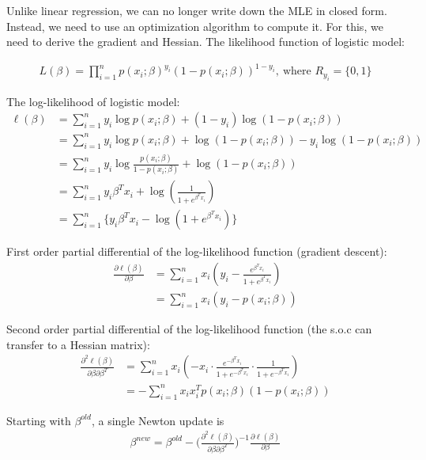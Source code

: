 \documentclass[12pt,a4paper]{article}%
\theoremstyle{definition}
\theoremstyle{plain}
\numberwithin{equation}{section}
\begin{document}
Unlike linear regression, we can no longer write down the MLE in closed form.
Instead, we need to use an optimization algorithm to compute it.
For this, we need to derive the gradient and Hessian. The likelihood function of logistic model:

\begin{gather}
L(\beta) = \prod_{i=1}^{n} p(x_{i};\beta)^{y_{i}} (1-p(x_{i};\beta))^{1-y_{i}},~\text{where~} R_{y_{i}}=\{0,1\}
\end{gather}

The log-likelihood of logistic model:
\begin{align*}
\ell(\beta)& = \sum\limits_{i=1}^{n} y_{i} \log p(x_{i};\beta)+(1-y_{i})\log (1-p(x_{i};\beta)) \\
		   & = \sum\limits_{i=1}^{n} y_{i} \log p(x_{i};\beta) + \log (1-p(x_{i};\beta)) - y_{i} \log (1-p(x_{i};\beta))\\
		   & = \sum\limits_{i=1}^{n} y_{i} \log \frac{p(x_{i};\beta)}{1-p(x_{i};\beta)} + \log (1-p(x_{i};\beta))  \\
		   & = \sum\limits_{i=1}^{n} y_{i}\beta^{T}x_{i}+ \log (\frac{1}{1+e^{\beta^{T}x_{i}}}) \\
 		   & = \sum\limits_{i=1}^{n} \{y_{i}\beta^{T}x_{i}-\log (1+e^{\beta^{T}x_{i}})\}
\end{align*}

First order partial differential of the log-likelihood function (gradient descent):
\begin{align*}
\frac{\partial \ell(\beta)}{\partial \beta} & = \sum\limits_{i=1}^{n} x_{i}(y_{i} - \frac{e^{\beta^{T}x_{i}}}{1+e^{\beta^{T}x_{i}}}) \\
 & = \sum\limits_{i=1}^{n} x_{i}(y_{i} - p(x_{i};\beta))
\end{align*}

Second order partial differential of the log-likelihood function (the s.o.c can transfer to a Hessian matrix):
\begin{align*}
\frac{\partial^{2} \ell(\beta)}{\partial \beta \partial \beta^{T}}
 & = \sum\limits_{i=1}^{n} x_{i}(-x_{i} \cdot \frac{e^{-\beta^{T} x_{i}}}{1+e^{-\beta^{T} x_{i}}} \cdot \frac{1}{1+e^{-\beta^{T} x_{i}}}) \\
 & = -\sum\limits_{i=1}^{n} x_{i}x_{i}^{T} p(x_{i};\beta) (1-p(x_{i};\beta))
\end{align*}

Starting with $\beta^{old}$, a single Newton update is
\begin{gather*}
\beta^{new} = \beta^{old} - \bigg(\frac{\partial^{2} \ell(\beta)}{\partial \beta \partial \beta^{T}}\bigg)^{-1} \frac{\partial \ell(\beta)}{\partial \beta}
\end{gather*}
\end{document}
